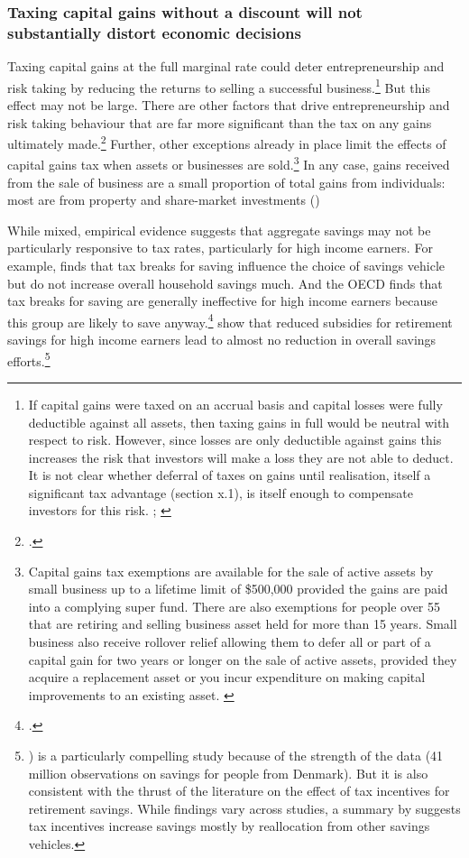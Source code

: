 \documentclass{grattan}\usepackage[]{graphicx}\usepackage[]{color}
\begin{document}
\subsubsection{Taxing capital gains without a discount will not substantially distort economic decisions}
Taxing capital gains at the full marginal rate could deter entrepreneurship and risk taking by reducing the returns to selling a successful business.\footnote{If capital gains were taxed on an accrual basis and capital losses were fully deductible against all assets, then taxing gains in full would be neutral with respect to risk. However, since losses are only deductible against gains this increases the risk that investors will make a loss they are not able to deduct. It is not clear whether deferral of taxes on gains until realisation, itself a significant tax advantage (section x.1), is itself enough to compensate investors for this risk. \textcite[p.~8]{Burman2009};  \textcite[p.~130]{Commission2004}}  But this effect may not be large. There are other factors that drive entrepreneurship and risk taking behaviour that are far more significant than the tax on any gains ultimately made.\footcite[p.~75]{Burman1999}   Further, other exceptions already in place limit the effects of capital gains tax when assets or businesses are sold.\footnote{Capital gains tax exemptions are available for the sale of active assets by small business up to a lifetime limit of \$500,000 provided the gains are paid into a complying super fund. There are also exemptions for people over 55 that are retiring and selling business asset held for more than 15 years. Small business also receive rollover relief allowing them to defer all or part of a capital gain for two years or longer on the sale of active assets, provided they acquire a replacement asset or you incur expenditure on making capital improvements to an existing asset. \textcite{ATO2014e}} In any case, gains received from the sale of business are a small proportion of total gains from individuals: most are from property and share-market investments ()

While mixed, empirical evidence suggests that aggregate savings may not be particularly responsive to tax rates, particularly for high income earners. For example, \textcite{Engen1996} finds that tax breaks for saving influence the choice of savings vehicle but do not increase overall household savings much. And the OECD finds that tax breaks for saving are generally ineffective for high income earners because this group are likely to save anyway.\footcite{OECD2007}  \textcite{chetty2013subsidies} show that reduced subsidies for retirement savings for high income earners lead to almost no reduction in overall savings efforts.\footnote{\textcite{chetty2013subsidies} ) is a particularly compelling study because of the strength of the data (41 million observations on savings for people from Denmark). But it is also consistent with the thrust of the literature on the effect of tax incentives for retirement savings. While findings vary across studies, a summary by \textcite{Antolin} suggests tax incentives increase savings mostly by reallocation from other savings vehicles. }
\end{document}
